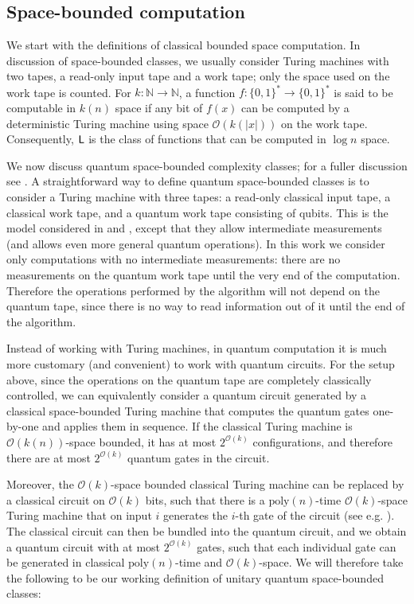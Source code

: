 \documentclass[11pt]{article}
\theoremstyle{definition}
\theoremstyle{remark}
\newcommand\Logspace{{\sf{L}}}
\newcommand\bigoh{\mathcal{O}}
\newcommand{\poly}{\textrm{poly}}
\begin{document}
\subsection{Space-bounded computation}
We start with the definitions of classical bounded space computation. In discussion of space-bounded classes, we usually consider Turing machines with two tapes, a read-only input tape and a work tape; only the space used on the work tape is counted. For $k:\mathbb{N}\rightarrow\mathbb{N}$, a function $f:\{0,1\}^{*}\rightarrow\{0,1\}^*$ is said to be computable in $k(n)$ space if any bit of $f(x)$ can be computed by a deterministic Turing machine using space $\bigoh(k(|x|))$ on the work tape.  Consequently, $\Logspace$ is the class of functions that can be computed in $\log{n}$ space.

We now discuss quantum space-bounded complexity classes; for a fuller discussion see \cite{Watrous09}. A straightforward way to define quantum space-bounded classes is to consider a Turing machine with three tapes: a read-only classical input tape, a classical work tape, and a quantum work tape consisting of qubits. This is the model considered in \cite{tashma} and \cite{Watrous03}, except that they allow intermediate measurements (and \cite{Watrous03} allows even more general quantum operations). In this work we consider only computations with no intermediate measurements: there are no measurements on the quantum work tape until the very end of the computation. Therefore the operations performed by the algorithm will not depend on the quantum tape, since there is no way to read information out of it until the end of the algorithm.

Instead of working with Turing machines, in quantum computation it is much more customary (and convenient) to work with quantum circuits. For the setup above, since the operations on the quantum tape are completely classically controlled, we can equivalently consider a quantum circuit generated by a classical space-bounded Turing machine that computes the quantum gates one-by-one and applies them in sequence. If the classical Turing machine is $\mathcal{O}(k(n))$-space bounded, it has at most $2^{\mathcal{O}(k)}$ configurations, and therefore there are at most $2^{\mathcal{O}(k)}$ quantum gates in the circuit. 

Moreover, the $\mathcal{O}(k)$-space bounded classical Turing machine can be replaced by a classical circuit on $\mathcal{O}(k)$ bits, such that there is a $\poly(n)$-time $\mathcal{O}(k)$-space Turing machine that on input $i$ generates the $i$-th gate of the circuit (see e.g. \cite[Section~6.8]{ab09}). The classical circuit can then be bundled into the quantum circuit, and we obtain a quantum circuit with at most $2^{\mathcal{O}(k)}$ gates, such that each individual gate can be generated in classical $\poly(n)$-time and $\mathcal{O}(k)$-space. We will therefore take the following to be our working definition of unitary quantum space-bounded classes:
\end{document}
